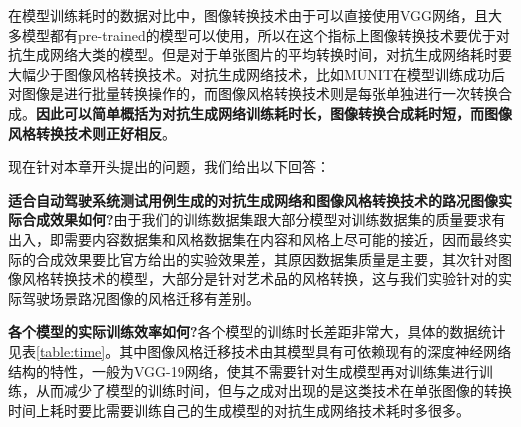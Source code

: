 在模型训练耗时的数据对比中，图像转换技术由于可以直接使用VGG网络，且大多模型都有pre-trained的模型可以使用，所以在这个指标上图像转换技术要优于对抗生成网络大类的模型。但是对于单张图片的平均转换时间，对抗生成网络耗时要大幅少于图像风格转换技术。对抗生成网络技术，比如MUNIT在模型训练成功后对图像是进行批量转换操作的，而图像风格转换技术则是每张单独进行一次转换合成。\textbf{因此可以简单概括为对抗生成网络训练耗时长，图像转换合成耗时短，而图像风格转换技术则正好相反}。

现在针对本章开头提出的问题，我们给出以下回答：

\textbf{适合自动驾驶系统测试用例生成的对抗生成网络和图像风格转换技术的路况图像实际合成效果如何?}\quad 由于我们的训练数据集跟大部分模型对训练数据集的质量要求有出入，即需要内容数据集和风格数据集在内容和风格上尽可能的接近，因而最终实际的合成效果要比官方给出的实验效果差，其原因数据集质量是主要，其次针对图像风格转换技术的模型，大部分是针对艺术品的风格转换，这与我们实验针对的实际驾驶场景路况图像的风格迁移有差别。

\textbf{各个模型的实际训练效率如何?}\quad 各个模型的训练时长差距非常大，具体的数据统计见表\ref{table:time}。其中图像风格迁移技术由其模型具有可依赖现有的深度神经网络结构的特性，一般为VGG-19网络，使其不需要针对生成模型再对训练集进行训练，从而减少了模型的训练时间，但与之成对出现的是这类技术在单张图像的转换时间上耗时要比需要训练自己的生成模型的对抗生成网络技术耗时多很多。
